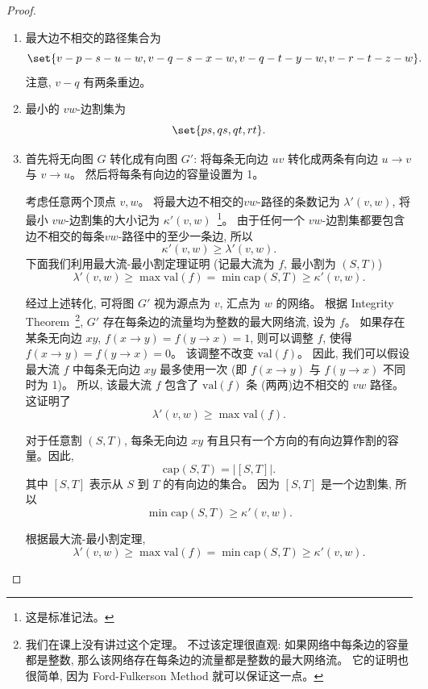 \documentclass[a4paper, justified]{tufte-handout}
\begin{document}
\begin{proof}
  \begin{enumerate}[(1)]
    \item 最大边不相交的路径集合为
      \[
        \set{v-p-s-u-w, v-q-s-x-w, v-q-t-y-w, v-r-t-z-w}.
      \]
      注意, $v-q$ 有两条重边。
    \item 最小的 $vw$-边割集为
      \[
        \set{ps, qs, qt, rt}.
      \]
    \item 首先将无向图 $G$ 转化成有向图 $G'$:
      将每条无向边 $uv$ 转化成两条有向边 $u \to v$ 与 $v \to u$。
      然后将每条有向边的容量设置为 1。

      考虑任意两个顶点 $v, w$。
      将最大边不相交的$vw$-路径的条数记为 $\lambda'(v, w)$,
      将最小 $vw$-边割集的大小记为 $\kappa'(v, w)$~\footnote{这是标准记法。}。
      由于任何一个 $vw$-边割集都要包含边不相交的每条$vw$-路径中的至少一条边, 所以
      \[
        \kappa'(v, w) \ge \lambda'(v, w).
      \]
      下面我们利用最大流-最小割定理证明 (记最大流为 $f$, 最小割为 $(S, T)$)
      \[
        \lambda'(v, w) \ge \max \text{val}(f)
                       = \min \text{cap}(S, T)
                       \ge \kappa'(v, w).
      \]

      经过上述转化, 可将图 $G'$ 视为源点为 $v$, 汇点为 $w$ 的网络。
      根据 Integrity Theorem~\footnote{我们在课上没有讲过这个定理。
      不过该定理很直观: 如果网络中每条边的容量都是整数,
      那么该网络存在每条边的流量都是整数的最大网络流。
      它的证明也很简单, 因为 Ford-Fulkerson Method 就可以保证这一点。},
      $G'$ 存在每条边的流量均为整数的最大网络流, 设为 $f$。
      如果存在某条无向边 $xy$, $f(x \to y) = f(y \to x) = 1$,
      则可以调整 $f$, 使得 $f(x \to y) = f(y \to x) = 0$。
      该调整不改变 $\text{val}(f)$。
      因此, 我们可以假设最大流 $f$ 中每条无向边 $xy$ 最多使用一次
      (即 $f(x \to y)$ 与 $f(y \to x)$ 不同时为 1)。
      所以, 该最大流 $f$ 包含了 $\text{val}(f)$ 条
      (两两)边不相交的 $vw$ 路径。这证明了
      \[
        \lambda'(v, w) \ge \max \text{val}(f).
      \]

      对于任意割 $(S, T)$,
      每条无向边 $xy$ 有且只有一个方向的有向边算作割的容量。因此,
      \[
        \text{cap}(S, T) = |[S, T]|.
      \]
      其中 $[S, T]$ 表示从 $S$ 到 $T$ 的有向边的集合。
      因为 $[S, T]$ 是一个边割集, 所以
      \[
        \min \text{cap}(S, T) \ge \kappa'(v, w).
      \]

      根据最大流-最小割定理,
      \[
        \lambda'(v, w) \ge \max \text{val}(f)
                       = \min \text{cap}(S, T)
                       \ge \kappa'(v, w).
      \]
  \end{enumerate}
\end{proof}
\end{document}
